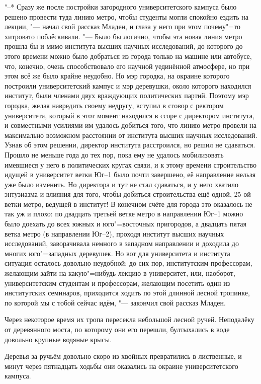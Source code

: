 "--* Сразу же после постройки загородного университетского кампуса было решено
провести туда линию метро, чтобы студенты могли спокойно ездить на лекции,
"--- начал свой рассказ Младен, и глаза у него при этом почему"=то хитровато
поблёскивали.
"--- Было бы логично, чтобы эта новая линия метро прошла бы и мимо института
высших научных исследований, до которого до этого времени можно было добраться
из города только на машине или автобусе, что, конечно, очень способствовало его
научной уединённой атмосфере, но при этом всё же было крайне неудобно.
Но мэр городка, на окраине которого построили университетский кампус и мэр
деревушки, около которого находился институт, были членами двух враждующих
политических партий.
Поэтому мэр городка, желая навредить своему недругу, вступил в сговор с ректором
университета, который в этот момент находился в ссоре с директором института, и
совместными усилиями им удалось добиться того, что линию метро провели на
максимально возможном расстоянии от института высших научных исследований.
Узнав об этом решении, директор института расстроился, но решил не сдаваться.
Прошло не меньше года до тех пор, пока ему не удалось мобилизовать имевшиеся у
него в политических кругах связи, и к этому времени строительство идущей в
университет ветки Юг--1 было почти завершено, её направление нельзя уже было
изменить.
Но директора и тут не стал сдаваться, и у него хватило энтузиазма и влияния для
того, чтобы добиться строительства ещё одной, 25-ой ветки метро, ведущей в
институт!
В конечном счёте для города это оказалось не так уж и плохо: по двадцать третьей
ветке метро в направлении Юг--1 можно было доехать до всех южных и
юго"=восточных пригородов, а двадцать пятая ветка метро (в направлении Юг--2),
проходя институт высших научных исследований, заворачивала немного в западном
направлении и доходила до многих юго"=западных деревушек.
Но вот для университета и института ситуация осталось довольно неудобной: до сих
пор, институтским профессорам, желающим зайти на какую"=нибудь лекцию в
университет, или, наоборот, университетским студентам и профессорам, желающим
посетить один из институтских семинаров, приходится ходить по этой длинной
лесной тропинке, по которой мы с тобой сейчас идём, "--- закончил свой рассказ
Младен.

Через некоторое время их тропа пересекла небольшой лесной ручей.
Неподалёку от деревянного моста, по которому они его перешли, бултыхались в воде
довольно крупные водяные крысы.

Деревья за ручьём довольно скоро из хвойных превратились в лиственные, и минут
через пятнадцать ходьбы они оказались на окраине университетского кампуса.

